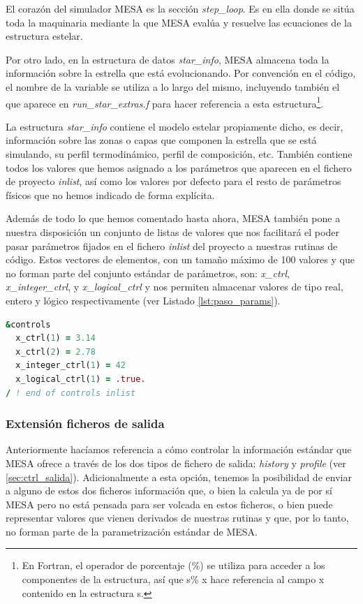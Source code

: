 El corazón del simulador MESA es la sección \textit{step\_loop}. Es en ella donde se sitúa toda la maquinaria mediante la que MESA evalúa y resuelve las ecuaciones de la estructura estelar.\par

Por otro lado, en la estructura de datos \textit{star\_info}, MESA almacena toda la información sobre la estrella que está evolucionando. Por convención en el código, el nombre de la variable se utiliza a lo largo del mismo, incluyendo también el que aparece en \textit{run\_star\_extras.f} para hacer referencia a esta estructura\footnote{En Fortran, el operador de porcentaje (\%) se utiliza para acceder a los componentes de la estructura, así que s\% x hace referencia al campo x contenido en la estructura s.}.\par

La estructura \textit{star\_info} contiene el modelo estelar propiamente dicho, es decir, información sobre las zonas o capas que componen la estrella que se está simulando, su perfil termodinámico, perfil de composición, etc. También contiene todos los valores que hemos asignado a los parámetros que aparecen en el fichero de proyecto \textit{inlist}, así como los valores por defecto para el resto de parámetros físicos que no hemos indicado de forma explícita.\par

Además de todo lo que hemos comentado hasta ahora, MESA también pone a nuestra disposición un conjunto de listas de valores que nos facilitará el poder pasar parámetros fijados en el fichero \textit{inlist} del proyecto a nuestras rutinas de código. Estos vectores de elementos, con un tamaño máximo de 100 valores y que no forman parte del conjunto estándar de parámetros, son: \textit{x\_ctrl}, \textit{x\_integer\_ctrl}, y \textit{x\_logical\_ctrl} y nos permiten almacenar valores de tipo real, entero y lógico respectivamente (ver Listado \ref{lst:paso_params}).\par

\begin{lstlisting}[language=Fortran, float, caption={Paso de parámetros no estándar a través del fichero de proyecto inlist}, label={lst:paso_params}]
&controls
  x_ctrl(1) = 3.14
  x_ctrl(2) = 2.78
  x_integer_ctrl(1) = 42
  x_logical_ctrl(1) = .true.
/ ! end of controls inlist
\end{lstlisting}

\subsubsection{Extensión ficheros de salida}
Anteriormente hacíamos referencia a cómo controlar la información estándar que MESA ofrece a través de los dos tipos de fichero de salida: \textit{history} y \textit{profile} (ver \ref{sec:ctrl_salida}). Adicionalmente a esta opción, tenemos la posibilidad de enviar a alguno de estos dos ficheros información que, o bien la calcula ya de por sí MESA pero no está pensada para ser volcada en estos ficheros, o bien puede representar valores que vienen derivados de nuestras rutinas y que, por lo tanto, no forman parte de la parametrización estándar de MESA.\par

